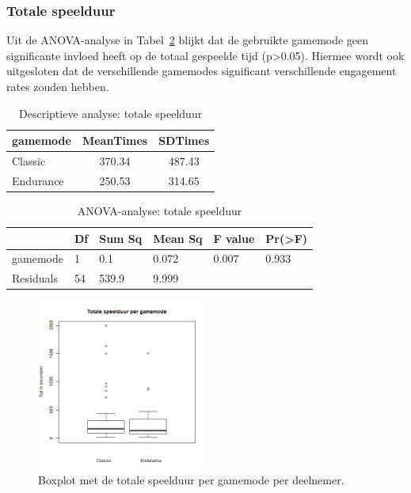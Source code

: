 \documentclass[11pt]{article}
\begin{document}
\subsubsection{Totale speelduur}
Uit de ANOVA-analyse in Tabel~\ref{ANOVA-times} blijkt dat de gebruikte gamemode geen significante invloed heeft op de totaal gespeelde tijd (p\textgreater 0.05). Hiermee wordt ook uitgesloten dat de verschillende gamemodes significant verschillende engagement rates zouden hebben.
	\begin{table}[h]
		\centering
		\begin{tabular}{|lcc|}
        	\hline
			\textbf{gamemode} & \textbf{MeanTimes} & \textbf{SDTimes} \\
            \hline
			Classic & 370.34 & 487.43  \\
			Endurance & 250.53 & 314.65 \\
			\hline
		\end{tabular}
		\caption{Descriptieve analyse: totale speelduur}\label{analyse:times}
    \end{table}

\begin{table}[h]
\centering
\begin{tabular}{|llllll|}
\hline
          & \textbf{Df} & \textbf{Sum Sq}   & \textbf{Mean Sq} & \textbf{F value} & \textbf{Pr(\textgreater F)} \\
\hline
gamemode  & 1  & 0.1      & 0.072   & 0.007   & 0.933             \\
Residuals & 54 & 539.9    & 9.999   &         &                   \\
\hline
\end{tabular}
\caption{ANOVA-analyse: totale speelduur}
\label{ANOVA-times}
\end{table}

\begin{figure}[h]
	\centering
	\includegraphics[width=0.5\textwidth]{pictures/TimePlayed.png}
    \caption{Boxplot met de totale speelduur per gamemode per deelnemer.}
    \label{time:played:gamemode}
\end{figure}
\end{document}
